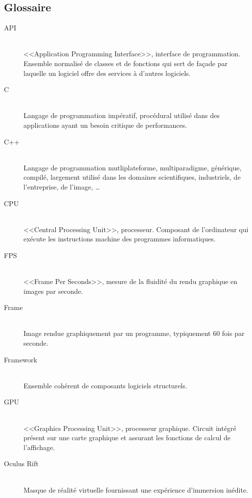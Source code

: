 \documentclass[a4paper,french,12pt]{article}
\begin{document}
	\subsection{Glossaire}
		\begin{description}
		
		\item [API]~\\
		    <<Application Programming Interface>>, interface de programmation. Ensemble normalisé de classes et de 
		    fonctions qui sert de façade par laquelle un logiciel offre des services à d'autres logiciels.
		
		\item [C] ~\\
		    Langage de programmation impératif, procédural utilisé dans des applications ayant un besoin critique
		    de performances.
		    
		 \item [C++] ~\\
		    Langage de programmation mutliplateforme, multiparadigme, générique, compilé, largement utilisé
		    dans les domaines scientifiques, industriels, de l'entreprise, de l'image, \ldots
		 
		 \item [CPU]~\\
		    <<Central Processing Unit>>, processeur. 
		    Composant de l'ordinateur qui exécute les instructions machine des programmes informatiques.
		 
		 \item [FPS] ~\\
		      <<Frame Per Seconds>>, mesure de la fluidité du rendu graphique en images par seconde.
		 
		 \item [Frame]~\\
		    Image rendue graphiquement par un programme, typiquement 60 fois par seconde.
		    
		 \item [Framework]~\\
		    Ensemble cohérent de composants logiciels structurels.

		 \item [GPU]~\\
		    <<Graphics Processing Unit>>, processeur graphique.
		    Circuit intégré présent sur une carte graphique et assurant les fonctions de calcul de l'affichage.
		 
		 \item [Oculus Rift]~\\
		    Masque de réalité virtuelle fournissant une expérience d'immersion inédite.
		    

\end{description}
\end{document}

